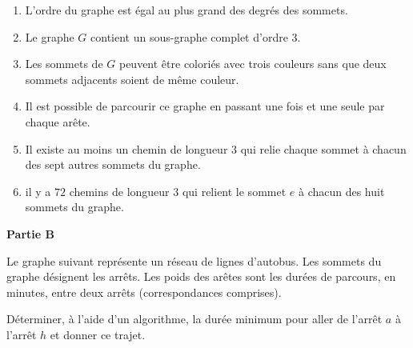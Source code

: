 \documentclass[]{prof}
\begin{document}
\bigskip
\begin{enumerate}
\item L'ordre du graphe est égal au plus grand des degrés des sommets.
\item Le graphe $G$ contient un sous-graphe complet d'ordre $3$.
\item Les sommets de $G$ peuvent être coloriés avec trois couleurs sans que deux sommets adjacents soient de même couleur.
\item Il est possible de parcourir ce graphe en passant une fois et une seule par chaque arête.
\item Il existe au moins un chemin de longueur $3$ qui relie chaque sommet à chacun  des sept autres sommets du graphe.
\item il y a $72$ chemins de longueur $3$ qui relient le sommet $e$ à chacun des huit sommets du graphe.
\end{enumerate}

\vfill\newpage\null 

\textbf{Partie B}

Le graphe suivant représente un réseau de lignes d'autobus. Les sommets du graphe désignent les arrêts. Les poids des arêtes sont les durées de parcours,  en minutes, entre deux arrêts (correspondances comprises).

\medskip
\begin{center}
\end{center}

\bigskip
Déterminer, à l'aide d'un algorithme, la durée minimum pour aller de l'arrêt $a$  à l'arrêt $h$ et donner ce trajet.

 
\end{document}
